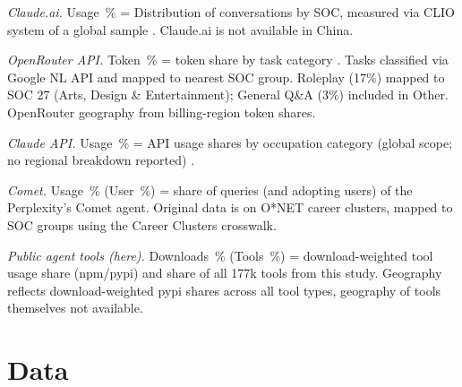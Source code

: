 \documentclass[manuscript,screen,nonacm,oneside]{acmart}
\begin{document}
\begin{table}[htbp]
\begin{minipage}{\linewidth}
\textit{Claude.ai.} Usage~\% = Distribution of conversations by SOC, measured via CLIO system of a global sample \citep{anthropic2026aeiv4}. Claude.ai is not available in China.

\textit{OpenRouter API.} Token~\% = token share by task category \citep{aubakirova2025state}. Tasks classified via Google NL API and mapped to nearest SOC group. Roleplay (17\%) mapped to SOC 27 (Arts, Design \& Entertainment); General Q\&A (3\%) included in Other. OpenRouter geography from billing-region token shares.

\textit{Claude API.} Usage~\% = API usage shares by occupation category (global scope; no regional breakdown reported) \citep{anthropic2026aeiv4}.

\textit{Comet.} Usage~\% (User~\%) = share of queries (and adopting users) of the Perplexity's Comet agent. Original data is on O*NET career clusters, mapped to SOC groups using the Career Clusters crosswalk. \citep{yang2025adoption}

\textit{Public agent tools (here).} Downloads~\% (Tools~\%) = download-weighted tool usage share (npm/pypi) and share of all 177k tools from this study. Geography reflects download-weighted pypi shares across all tool types, geography of tools themselves not available.
\end{minipage}
\end{table}

\section{Data}
\label{sec:data}
\end{document}
